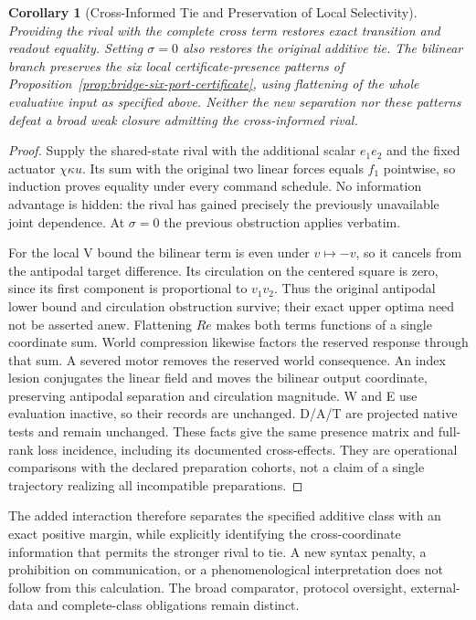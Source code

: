 \documentclass[11pt,a4paper]{article}
\newtheorem{corollary}[theorem]{Corollary}
\theoremstyle{definition}
\begin{document}
\begin{corollary}[Cross-Informed Tie and Preservation of Local Selectivity]\label{cor:bridge-cross-informed-tie}
Providing the rival with the complete cross term restores exact transition and readout equality. Setting $\sigma=0$ also restores the original additive tie. The bilinear branch preserves the six local certificate-presence patterns of Proposition~\ref{prop:bridge-six-port-certificate}, using flattening of the whole evaluative input as specified above. Neither the new separation nor these patterns defeat a broad weak closure admitting the cross-informed rival.
\end{corollary}
\begin{proof}
Supply the shared-state rival with the additional scalar $e_1e_2$ and the fixed actuator $\chi\kappa u$. Its sum with the original two linear forces equals $f_1$ pointwise, so induction proves equality under every command schedule. No information advantage is hidden: the rival has gained precisely the previously unavailable joint dependence. At $\sigma=0$ the previous obstruction applies verbatim.

For the local V bound the bilinear term is even under $v\mapsto-v$, so it cancels from the antipodal target difference. Its circulation on the centered square is zero, since its first component is proportional to $v_1v_2$. Thus the original antipodal lower bound and circulation obstruction survive; their exact upper optima need not be asserted anew. Flattening $Re$ makes both terms functions of a single coordinate sum. World compression likewise factors the reserved response through that sum. A severed motor removes the reserved world consequence. An index lesion conjugates the linear field and moves the bilinear output coordinate, preserving antipodal separation and circulation magnitude. W and E use evaluation inactive, so their records are unchanged. D/A/T are projected native tests and remain unchanged. These facts give the same presence matrix and full-rank loss incidence, including its documented cross-effects. They are operational comparisons with the declared preparation cohorts, not a claim of a single trajectory realizing all incompatible preparations.
\end{proof}

The added interaction therefore separates the specified additive class with an exact positive margin, while explicitly identifying the cross-coordinate information that permits the stronger rival to tie. A new syntax penalty, a prohibition on communication, or a phenomenological interpretation does not follow from this calculation. The broad comparator, protocol oversight, external-data and complete-class obligations remain distinct.
\end{document}
